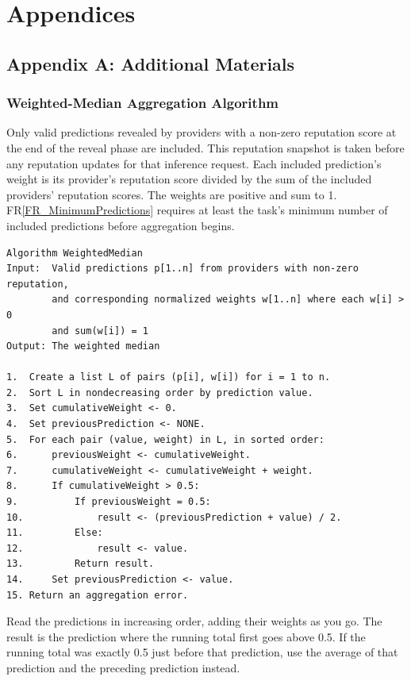 \documentclass[12pt]{article}
\newcommand{\rref}[1]{FR\ref{#1}}
\begin{document}
\newpage{}

\section{Appendices}

\subsection{Appendix A: Additional Materials}

\subsubsection{Weighted-Median Aggregation Algorithm}
\label{App_WeightedMedian}

Only valid predictions revealed by providers with a non-zero reputation score
at the end of the reveal phase are included. This reputation snapshot is
taken before any reputation updates for that inference request. Each included
prediction's weight is its provider's reputation score divided by the sum of
the included providers' reputation scores. The weights are positive and sum
to 1. \rref{FR_MinimumPredictions} requires at least the task's minimum number of included predictions
before aggregation begins.

\begin{verbatim}
Algorithm WeightedMedian
Input:  Valid predictions p[1..n] from providers with non-zero reputation,
        and corresponding normalized weights w[1..n] where each w[i] > 0
        and sum(w[i]) = 1
Output: The weighted median

1.  Create a list L of pairs (p[i], w[i]) for i = 1 to n.
2.  Sort L in nondecreasing order by prediction value.
3.  Set cumulativeWeight <- 0.
4.  Set previousPrediction <- NONE.
5.  For each pair (value, weight) in L, in sorted order:
6.      previousWeight <- cumulativeWeight.
7.      cumulativeWeight <- cumulativeWeight + weight.
8.      If cumulativeWeight > 0.5:
9.          If previousWeight = 0.5:
10.             result <- (previousPrediction + value) / 2.
11.         Else:
12.             result <- value.
13.         Return result.
14.     Set previousPrediction <- value.
15. Return an aggregation error.
\end{verbatim}

Read the predictions in increasing order, adding their weights as you go. The
result is the prediction where the running total first goes above 0.5. If the
running total was exactly 0.5 just before that prediction, use the average of
that prediction and the preceding prediction instead.
\end{document}
